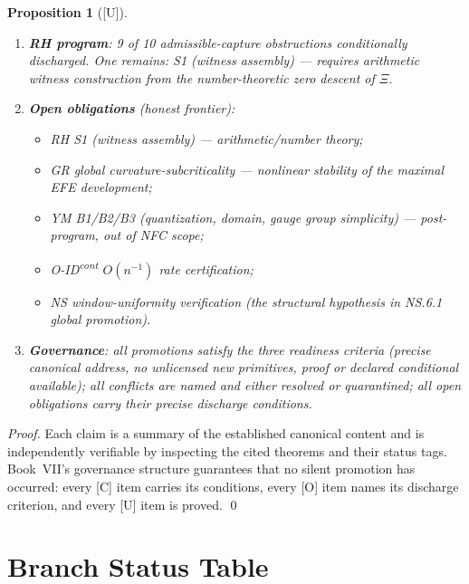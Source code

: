 \documentclass[12pt,oneside]{amsbook}
\theoremstyle{plain}
\newtheorem{proposition}[theorem]{Proposition}
\theoremstyle{definition}
\theoremstyle{remark}
\newcommand{\status}[1]{\textup{[#1]}}
\begin{document}
\begin{proposition}[\status{U}]
\begin{enumerate}[label=\textup{(\Roman*)}]
  \item \textbf{RH program}: 9 of 10 admissible-capture
    obstructions conditionally discharged.  One remains:
    S1 (witness assembly) --- requires arithmetic witness
    construction from the number-theoretic zero descent of $\Xi$.

  \item \textbf{Open obligations} (honest frontier):
    \begin{itemize}
      \item RH S1 (witness assembly) --- arithmetic/number theory;
      \item GR global curvature-subcriticality --- nonlinear
        stability of the maximal EFE development;
      \item YM B1/B2/B3 (quantization, domain, gauge group
        simplicity) --- post-program, out of NFC scope;
      \item O-ID\textsuperscript{cont} $O(n^{-1})$ rate
        certification;
      \item NS window-uniformity verification (the structural
        hypothesis in NS.6.1 global promotion).
    \end{itemize}

  \item \textbf{Governance}: all promotions satisfy the three
    readiness criteria (precise canonical address, no unlicensed
    new primitives, proof or declared conditional available);
    all conflicts are named and either resolved or quarantined;
    all open obligations carry their precise discharge conditions.
\end{enumerate}
\end{proposition}

\begin{proof}
Each claim is a summary of the established canonical content
and is independently verifiable by inspecting the cited
theorems and their status tags.  Book~VII's governance
structure guarantees that no silent promotion has occurred:
every [C] item carries its conditions, every [O] item names
its discharge criterion, and every [U] item is proved. \qed
\end{proof}

\section{Branch Status Table}
\label{sec:status-table}
\end{document}
